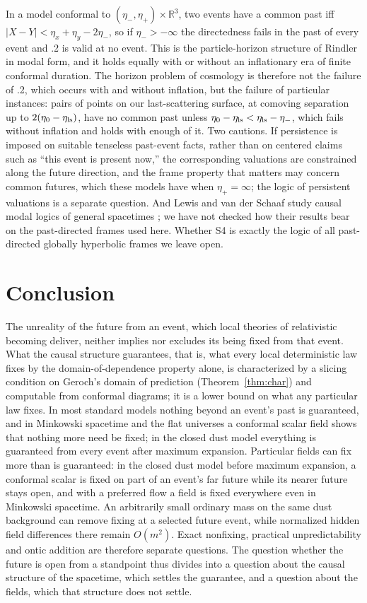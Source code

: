 \documentclass[11pt]{article}
\theoremstyle{definition}
\begin{document}
In a model conformal to $(\eta_-,\eta_+)\times\mathbb R^3$, two events have a
common past iff $|X-Y|<\eta_x+\eta_y-2\eta_-$, so if $\eta_->-\infty$ the
directedness fails in the past of every event and .2 is valid at no event. This is the particle-horizon structure of Rindler
\citep{Rindler1956} in modal form, and it holds equally with or without an
inflationary era of finite conformal duration. The horizon problem of
cosmology \citep{Guth1981} is therefore not the failure of .2, which occurs
with and without inflation, but the failure of particular instances: pairs of points
on our last-scattering surface, at comoving separation up to
$2(\eta_0-\eta_{\rm ls})$, have no common past unless
$\eta_0-\eta_{\rm ls}<\eta_{\rm ls}-\eta_-$, which fails without inflation and
holds with enough of it. Two cautions. If persistence is imposed on suitable tenseless past-event
facts, rather than on centered claims such as ``this event is present now,''
the corresponding valuations are
constrained along the future direction, and the frame property that matters
may concern common futures, which these models have when $\eta_+=\infty$; the logic of persistent
valuations is a separate question. And Lewis and van der Schaaf study causal
modal logics of general spacetimes \citep{vdSchaaf2026}; we have not checked
how their results bear on the past-directed frames used here. Whether S4 is
exactly the logic of all past-directed globally hyperbolic frames we leave
open.

\section{Conclusion}

The unreality of the future from an event, which local theories of
relativistic becoming deliver, neither implies nor excludes its being fixed
from that event. What the causal structure guarantees, that is, what every
local deterministic law fixes by the domain-of-dependence property alone, is
characterized by a slicing condition on Geroch's domain of prediction
(Theorem~\ref{thm:char}) and computable from conformal diagrams; it is a
lower bound on what any particular law fixes. In most standard models nothing beyond an
event's past is guaranteed, and in Minkowski spacetime and the flat universes
a conformal scalar field shows that nothing more need be fixed; in the closed
dust model everything is guaranteed from every event after maximum
expansion. Particular fields can fix more than is guaranteed: in the closed dust
model before maximum expansion, a conformal scalar is fixed on part of an
event's far future while its nearer future stays open, and with a preferred
flow a field is fixed everywhere even in Minkowski spacetime.
An arbitrarily small ordinary mass on the same dust background can remove
fixing at a selected future event, while normalized hidden field differences
there remain $O(m^2)$. Exact nonfixing, practical unpredictability and ontic
addition are therefore separate questions. The question whether the future is open from a
standpoint thus divides into a question about the causal structure of the
spacetime, which settles the guarantee, and a question about the fields,
which that structure does not settle.
\end{document}
